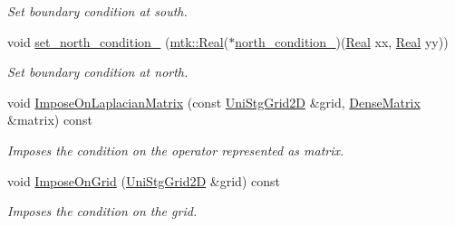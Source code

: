 \begin{DoxyCompactItemize}
\begin{DoxyCompactList}\small\item\em Set boundary condition at south. \end{DoxyCompactList}\item 
void \hyperlink{classmtk_1_1BCDescriptor2D_ab9d25f5b0ca0826b9802874bcd741a9d}{set\+\_\+north\+\_\+condition\+\_\+} (\hyperlink{group__c01-roots_gac080bbbf5cbb5502c9f00405f894857d}{mtk\+::\+Real}($\ast$\hyperlink{classmtk_1_1BCDescriptor2D_af3ecae6fedd3f3422e62b247ef5fea42}{north\+\_\+condition\+\_\+})(\hyperlink{group__c01-roots_gac080bbbf5cbb5502c9f00405f894857d}{Real} xx, \hyperlink{group__c01-roots_gac080bbbf5cbb5502c9f00405f894857d}{Real} yy))
\begin{DoxyCompactList}\small\item\em Set boundary condition at north. \end{DoxyCompactList}\item 
void \hyperlink{classmtk_1_1BCDescriptor2D_abade249fa28783a5383a7c2aaf570ea9}{Impose\+On\+Laplacian\+Matrix} (const \hyperlink{classmtk_1_1UniStgGrid2D}{Uni\+Stg\+Grid2\+D} \&grid, \hyperlink{classmtk_1_1DenseMatrix}{Dense\+Matrix} \&matrix) const 
\begin{DoxyCompactList}\small\item\em Imposes the condition on the operator represented as matrix. \end{DoxyCompactList}\item 
void \hyperlink{classmtk_1_1BCDescriptor2D_a5f0ff1fda1b5266dcd77ba2301c8ba2c}{Impose\+On\+Grid} (\hyperlink{classmtk_1_1UniStgGrid2D}{Uni\+Stg\+Grid2\+D} \&grid) const 
\begin{DoxyCompactList}\small\item\em Imposes the condition on the grid. \end{DoxyCompactList}\end{DoxyCompactItemize}
